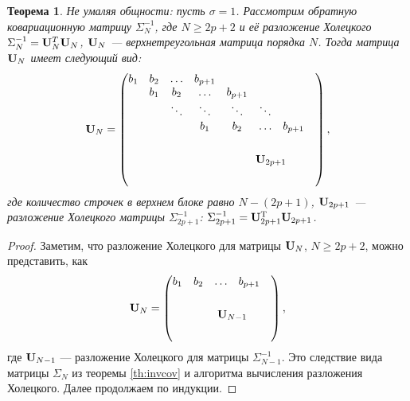 \documentclass[12pt,a4paper]{article}
\newtheorem{theorem}{Теорема}
\begin{document}
\begin{theorem}\label{th:invcov_chol}
	Не умаляя общности: пусть $\sigma = 1$. Рассмотрим обратную ковариационную матрицу $\Sigma_N^{-1}$, где $N \ge 2p + 2$ и её разложение Холецкого $\Sigma_N^{-1} = \mathbf{U}^T_N \mathbf{U}_N$, $\mathbf{U}_N$ --- верхнетреугольная матрица порядка $N$. Тогда матрица $\mathbf{U}_N$ имеет следующий вид:
	\begin{equation*}
	\bfU_N = \begin{pmatrix}
	b_1 & b_2 & \ldots & b_{p+1} &  &  &  &  \\ 
	& b_1 & b_2 & \ldots & b_{p+1} &  &  &  \\ 
	&  & \ddots & \ddots & \ddots & \ddots &  &  \\ 
	&  &  & b_1 & b_2 & \ldots & b_{p+1} &  \\ 
	&  &  &  & \multicolumn{4}{c}{\multirow{4}{*}{$\bfU_{2p+1}$}} \\
	&  &  &  & \multicolumn{4}{c}{\multirow{4}{*}{}} \\
	&  &  &  & \multicolumn{4}{c}{\multirow{4}{*}{}} \\
	&  &  &  & \multicolumn{4}{c}{\multirow{4}{*}{}}	
	\end{pmatrix},
	\end{equation*}
	где количество строчек в верхнем блоке равно $N - (2p + 1)$, $\mathbf{U}_{2p+1}$ --- разложение Холецкого матрицы $\Sigma_{2p+1}^{-1}$: $\Sigma_{2p+1}^{-1} = \mathbf{U}_{2p+1}^{\mathrm{T}} \mathbf{U}_{2p+1}$.
\end{theorem}
\begin{proof}
	Заметим, что разложение Холецкого для матрицы $\mathbf{U}_N$, $N \ge 2p + 2$, можно представить, как
	\begin{equation*}
	\bfU_N = \begin{pmatrix}
	b_1 & b_2 & \ldots & b_{p+1} &  \\ 
	& \multicolumn{4}{c}{\multirow{4}{*}{$\bfU_{N - 1}$}} \\
	& \multicolumn{4}{c}{\multirow{4}{*}{}} \\
	& \multicolumn{4}{c}{\multirow{4}{*}{}} \\
	& \multicolumn{4}{c}{\multirow{4}{*}{}}	
	\end{pmatrix},
	\end{equation*}	
	где $\mathbf{U}_{N-1}$ --- разложение Холецкого для матрицы $\Sigma_{N-1}^{-1}$. Это следствие вида матрицы $\Sigma_{N}$ из теоремы \ref{th:invcov} и алгоритма вычисления разложения Холецкого. Далее продолжаем по индукции.
\end{proof}
\end{document}
